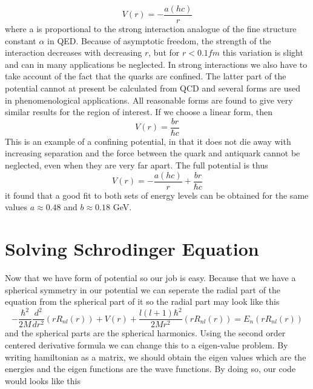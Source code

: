 \documentclass{article}
\begin{document}
\begin{equation}
	V(r)=-\frac{a(h c)}{r}
\end{equation}
where a is proportional to the strong interaction analogue of the fine structure constant \(\alpha\) in QED. Because of asymptotic freedom, the strength of the interaction decreases with decreasing \(r\), but for \(r < 0.1 fm\) this variation is slight and can in many applications be neglected.
In strong interactions we also have to take account of the fact that the quarks are confined.
The latter part of the potential cannot at present be calculated from QCD and several forms are used in phenomenological applications. All reasonable forms are found to give very similar results for the region of interest. If we choose a linear form, then
\begin{equation}
	V(r)=\frac{b r}{\hbar c}
\end{equation}
This is an example of a confining potential, in that it does not die away with increasing separation and the force between the quark and antiquark cannot be neglected, even when they are very far apart. The full potential is thus
\begin{equation}
	V(r)=-\frac{a(h c)}{r}+\frac{b r}{\hbar c}
\end{equation}
it found that a good fit to both sets of energy levels can be obtained for the same values \(a \approx 0.48\) and \(b \approx 0.18\) GeV.

\section{Solving Schrodinger Equation}
Now that we have form of potential so our job is easy. Because that we have a spherical symmetry in our potential we can seperate the radial part of the equation from the spherical part of it so the radial part may look like this
\begin{equation}
-\frac{\hbar^{2}}{2 M} \frac{d^{2}}{d r^{2}}\left(r R_{n l}(r)\right)+ V(r)+\frac{l(l+1) \hbar^{2}}{2 M r^{2}}\left(r R_{n l}(r)\right)=E_{n}\left(r R_{n l}(r)\right)
\end{equation}
and the spherical parts are the spherical harmonics. Using the second order centered derivative formula we can change this to a eigen-value problem. By writing hamiltonian as a matrix, we should obtain the eigen values which are the energies and the eigen functions are the wave functions. By doing so, our code would looks like this
\end{document}
